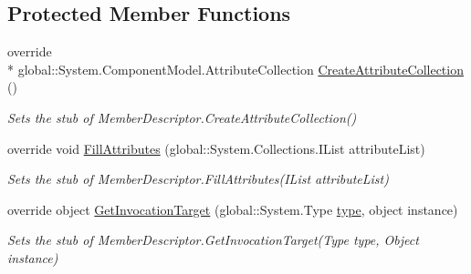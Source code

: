 \subsection*{Protected Member Functions}
\begin{DoxyCompactItemize}
\item 
override \\*
global\-::\-System.\-Component\-Model.\-Attribute\-Collection \hyperlink{class_system_1_1_component_model_1_1_fakes_1_1_stub_event_descriptor_a8db6e990479cda95f563b668e682dd36}{Create\-Attribute\-Collection} ()
\begin{DoxyCompactList}\small\item\em Sets the stub of Member\-Descriptor.\-Create\-Attribute\-Collection()\end{DoxyCompactList}\item 
override void \hyperlink{class_system_1_1_component_model_1_1_fakes_1_1_stub_event_descriptor_a53d05ea8c2c0c2b701e8660e2f08da28}{Fill\-Attributes} (global\-::\-System.\-Collections.\-I\-List attribute\-List)
\begin{DoxyCompactList}\small\item\em Sets the stub of Member\-Descriptor.\-Fill\-Attributes(\-I\-List attribute\-List)\end{DoxyCompactList}\item 
override object \hyperlink{class_system_1_1_component_model_1_1_fakes_1_1_stub_event_descriptor_a8f55db2689759002b8042fdbcb20c8ac}{Get\-Invocation\-Target} (global\-::\-System.\-Type \hyperlink{jquery-1_810_82-vsdoc_8js_a3940565e83a9bfd10d95ffd27536da91}{type}, object instance)
\begin{DoxyCompactList}\small\item\em Sets the stub of Member\-Descriptor.\-Get\-Invocation\-Target(\-Type type, Object instance)\end{DoxyCompactList}\end{DoxyCompactItemize}
